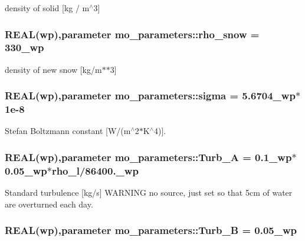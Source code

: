 density of solid \mbox{[}kg / m$^\wedge$3\mbox{]} 

\hypertarget{namespacemo__parameters_aca92cfe6ef280bfaccdfefb83e06f114}{
\subsubsection[{rho\_\-snow}]{\setlength{\rightskip}{0pt plus 5cm}REAL({\bf wp}),parameter {\bf mo\_\-parameters::rho\_\-snow} = 330\_\-wp}}
\label{namespacemo__parameters_aca92cfe6ef280bfaccdfefb83e06f114}


density of new snow \mbox{[}kg/m$\ast$$\ast$3\mbox{]} 

\hypertarget{namespacemo__parameters_a84bbd94990a472b5855a98d709d0a8af}{
\subsubsection[{sigma}]{\setlength{\rightskip}{0pt plus 5cm}REAL({\bf wp}),parameter {\bf mo\_\-parameters::sigma} = 5.6704\_\-wp$\ast$1e-\/8}}
\label{namespacemo__parameters_a84bbd94990a472b5855a98d709d0a8af}


Stefan Boltzmann constant \mbox{[}W/(m$^\wedge$2$\ast$K$^\wedge$4)\mbox{]}. 

\hypertarget{namespacemo__parameters_a42887cf935636d9eaf3fe6ad8cb3ee34}{
\subsubsection[{Turb\_\-A}]{\setlength{\rightskip}{0pt plus 5cm}REAL({\bf wp}),parameter {\bf mo\_\-parameters::Turb\_\-A} = 0.1\_\-wp$\ast$0.05\_\-wp$\ast$rho\_\-l/86400.\_\-wp}}
\label{namespacemo__parameters_a42887cf935636d9eaf3fe6ad8cb3ee34}


Standard turbulence \mbox{[}kg/s\mbox{]} WARNING no source, just set so that 5cm of water are overturned each day. 

\hypertarget{namespacemo__parameters_a9fcd0db13d2536e79d192a96ad2d0712}{
\subsubsection[{Turb\_\-B}]{\setlength{\rightskip}{0pt plus 5cm}REAL({\bf wp}),parameter {\bf mo\_\-parameters::Turb\_\-B} = 0.05\_\-wp}}
\label{namespacemo__parameters_a9fcd0db13d2536e79d192a96ad2d0712}



